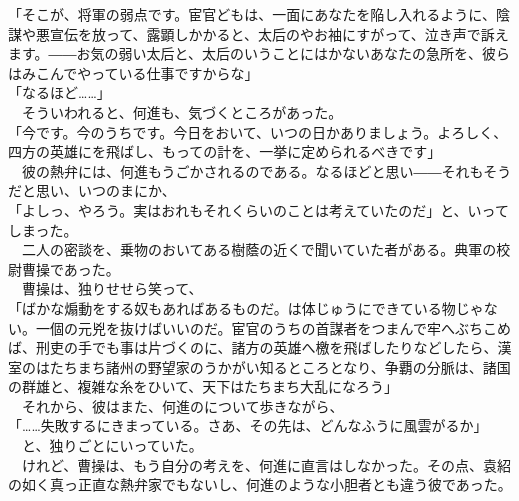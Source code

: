 \documentclass[
  paper=a5,
  fontsize=10pt,
  jafontsize=9.5pt,
  tate,                  %
  open_bracket_pos=nibu, %
]{jlreq}
\begin{document}
「そこが、将軍の弱点です。宦官どもは、一面にあなたを陥し入れるように、陰謀や悪宣伝を放って、露顕しかかると、太后のやお袖にすがって、泣き声で訴えます。――お気の弱い太后と、太后のいうことにはかないあなたの急所を、彼らはみこんでやっている仕事ですからな」\\


「なるほど……」\\


　そういわれると、何進も、気づくところがあった。\\


「今です。今のうちです。今日をおいて、いつの日かありましょう。よろしく、四方の英雄にを飛ばし、もっての計を、一挙に定められるべきです」\\


　彼の熱弁には、何進もうごかされるのである。なるほどと思い――それもそうだと思い、いつのまにか、\\


「よしっ、やろう。実はおれもそれくらいのことは考えていたのだ」と、いってしまった。\\


　二人の密談を、乗物のおいてある樹蔭の近くで聞いていた者がある。典軍の校尉曹操であった。\\


　曹操は、独りせせら笑って、\\


「ばかな煽動をする奴もあればあるものだ。は体じゅうにできている物じゃない。一個の元兇を抜けばいいのだ。宦官のうちの首謀者をつまんで牢へぶちこめば、刑吏の手でも事は片づくのに、諸方の英雄へ檄を飛ばしたりなどしたら、漢室のはたちまち諸州の野望家のうかがい知るところとなり、争覇の分脈は、諸国の群雄と、複雑な糸をひいて、天下はたちまち大乱になろう」\\


　それから、彼はまた、何進のについて歩きながら、\\


「……失敗するにきまっている。さあ、その先は、どんなふうに風雲がるか」\\


　と、独りごとにいっていた。\\


　けれど、曹操は、もう自分の考えを、何進に直言はしなかった。その点、袁紹の如く真っ正直な熱弁家でもないし、何進のような小胆者とも違う彼であった。\\
\end{document}
